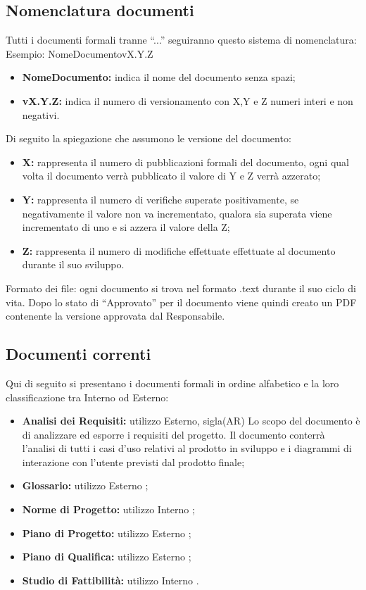 \documentclass[NormeDiProgetto.tex]{subfiles}
\begin{document}
	\subsection{Nomenclatura documenti}
	Tutti i documenti formali tranne “...” seguiranno questo sistema di nomenclatura:
	Esempio: NomeDocumento\textunderscore vX.Y.Z
	
	\begin{itemize}
		\item\textbf{ NomeDocumento:} indica il nome del documento senza spazi;
		\item \textbf{vX.Y.Z:} indica il numero di versionamento con X,Y e Z numeri interi e non negativi.	
	\end{itemize}
	Di seguito la spiegazione che assumono le versione del documento:
	\begin{itemize}
		\item \textbf{X:} rappresenta il numero di pubblicazioni formali del documento, ogni qual volta il documento verrà pubblicato il valore di Y e Z verrà azzerato;
		\item \textbf{Y:} rappresenta il numero di verifiche superate positivamente, se negativamente il valore non va incrementato, qualora sia superata viene incrementato di uno e si azzera il valore della Z;
		\item \textbf{Z:} rappresenta il numero di modifiche effettuate effettuate al documento durante il suo sviluppo.	
	\end{itemize}
	
	Formato dei file: ogni documento si trova nel formato .text durante il suo ciclo di vita.
	Dopo lo stato di “Approvato” per il documento viene quindi creato un PDF contenente la versione approvata dal Responsabile.
	
	\subsection{Documenti correnti}
	Qui di seguito si presentano i documenti formali in ordine alfabetico e la loro classificazione tra Interno od Esterno:
	\begin{itemize}
		\item \textbf{Analisi dei Requisiti:} utilizzo Esterno, sigla(AR)
		Lo scopo del documento è di analizzare ed esporre i requisiti del progetto. Il documento conterrà l'analisi di tutti i casi d'uso relativi al prodotto in sviluppo e i diagrammi di interazione con l'utente previsti dal prodottofinale;
		
		\item \textbf{Glossario:}
		utilizzo Esterno ;
		
		\item \textbf{Norme di Progetto:}
		utilizzo Interno ;
		
		\item \textbf{Piano di Progetto:}
		utilizzo Esterno ;
		
		\item \textbf{Piano di Qualifica:}	utilizzo Esterno ;
		
		\item \textbf{Studio di Fattibilità:}	utilizzo Interno .
		
	\end{itemize}
	
\end{document}
